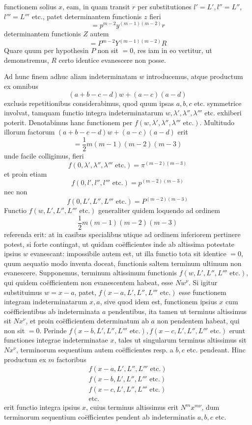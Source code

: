 functionem solius $x$, eam, in quam transit $r$ per substitutiones $l'=L',l''=L''$,
$l'''=L'''$ etc., patet determinantem functionis $z$ fieri
\[
=p^{m-2}y^{(m-1)(m-2)}r
\]
determinantem functionis $Z$ autem
\[
=P^{m-2}Y^{(m-1)(m-2)}R
\]
Quare quum per hypothesin $P$ non sit $=0$, res iam in eo vertitur, ut demonstremus, $R$ certo identice evanescere non posse.

Ad hunc finem adhuc aliam indeterminatam $w$ introducemus, atque productum ex omnibus
\[
(a+b-c-d)w+(a-c)(a-d)
\]
exclusis repetitionibus considerabimus, quod quum ipsas $a,b,c$ etc. symmetrice
involvat, tamquam functio integra indeterminatarum $w,\lambda',\lambda'',\lambda'''$ etc. exhiberi
poterit. Denotabimus hanc functionem per $f(w,\lambda',\lambda'',\lambda'''\text{ etc.})$. Multitudo illorum factorum $(a+b-c-d)w+(a-c)(a-d)$ erit
\[
=\frac12m(m-1)(m-2)(m-3)
\]
unde facile colligimus, fieri
\[
f(0,\lambda',\lambda'',\lambda'''\text{ etc.})=\pi^{(m-2)(m-3)}
\]
et proin etiam
\[
f(0,l',l'',l'''\text{ etc.})=p^{(m-2)(m-3)}
\]
nec non
\[
f(0,L',L'',L'''\text{ etc.})=P^{(m-2)(m-3)}
\]
Functio $f(w,\allowbreak L',\allowbreak L'',\allowbreak L'''\text{ etc.})$ generaliter quidem loquendo ad ordinem
\[
\frac12m(m-1)(m-2)(m-3)
\]
referenda erit: at in casibus specialibus utique ad ordinem inferiorem pertinere
potest, si forte contingat, ut quidam coëfficientes inde ab altissima potestate ipsius
$w$ evanescant: impossibile autem est, ut illa functio tota sit identice $=0$, quum
aequatio modo inventa doceat, functionis saltem terminum ultimum non evanescere. Supponemus, terminum altissimum functionis $f(w,\allowbreak L',\allowbreak L'',\allowbreak L'''\text{ etc.})$, qui
quidem coëfficientem non evanescentem habeat, esse $Nw^\nu$. Si igitur substituimus
$w=x-a$, patet, $f(x-a,L',L'',L'''\text{ etc.})$ esse functionem integram indeterminatarum $x,a$, sive quod idem est, functionem ipsius $x$ cum coëfficientibus ab
indeterminata $a$ pendentibus, ita tamen ut terminus altissimus sit $Nx^\nu$, et proin
coëfficientem determinatum ab $a$ non pendentem habeat, qui non sit $=0$. Perinde $f(x-b,L',L'',L'''\text{ etc.}),f(x-c,L',L'',L'''\text{ etc.})$ erunt functiones integrae
indeterminatae $x$, tales ut singularum terminus altissimus sit $Nx^\nu$, terminorum
sequentium autem coëfficientes resp. a $b,c$ etc. pendeant. Hinc productum ex
$m$ factoribus
\[
\begin{gathered}
f(x-a,L',L'',L'''\text{ etc.})\\
f(x-b,L',L'',L'''\text{ etc.})\\
f(x-c,L',L'',L'''\text{ etc.})\\
\text{etc.}
\end{gathered}
\]
erit functio integra ipsius $x$, cuius terminus altissimus erit $N^mx^{m\nu}$, dum terminorum sequentium coëfficientes pendent ab indeterminatis $a,b,c$ etc.

